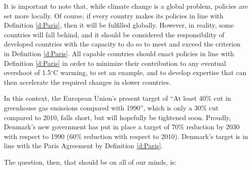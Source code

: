 It is important to note that, while climate change is a global problem, policies are set more locally. Of course, if every country makes its policies in line with Definition \ref{d:Paris}, then it will be fulfilled globally. However, in reality, some countries will fall behind, and it should be considered the responsibility of developed countries with the capacity to do so to meet and exceed the criterion in Definition \ref{d:Paris}. 
All 
capable countries should enact policies in line with Definition \ref{d:Paris} in order to minimize their contribution to any eventual overshoot of 1.5$^\circ$C warming, to set an example, and to develop expertise that can then accelerate the required changes in slower countries.

In this context, the European Union's present target of ``At least 40\% cut in greenhouse gas emissions compared with 1990''\cite{EC_2030}, which is only a 30\% cut compared to 2010\cite{Ritchie2019a}, falls short, but will hopefully be tightened soon. Proudly, Denmark's new government has put in place a target of 70\% reduction by 2030 with respect to 1990 (60\% reduction with respect to 2010)\cite{CHN_70p}. Denmark's target is in line with the Paris Agreement by Definition \ref{d:Paris}. 



The question, then, that should be on all of our minds, is:

